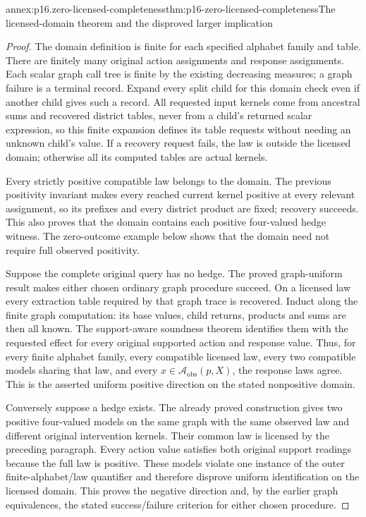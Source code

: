 \begin{annexitem}{annex:p16.zero-licensed-completeness}{thm:p16-zero-licensed-completeness}{The licensed-domain theorem and the disproved larger implication}
\begin{proof}
The domain definition is finite for each specified alphabet family
and table. There are finitely many original action assignments
and response assignments. Each scalar graph call tree is finite
by the existing decreasing measures; a graph failure is a terminal
record. Expand every split child for this domain check even if
another child gives such a record. All requested input kernels
come from ancestral sums and recovered district tables, never
from a child's returned scalar expression, so this finite expansion
defines its table requests without needing an unknown child's value.
If a recovery request fails, the law is outside the licensed
domain; otherwise all its computed tables are actual kernels.

Every strictly positive compatible law belongs to the domain.
The previous positivity invariant makes every reached current
kernel positive at every relevant assignment, so its prefixes
and every district product are fixed; recovery succeeds. This
also proves that the domain contains each positive four-valued
hedge witness. The zero-outcome example below shows that the
domain need not require full observed positivity.

Suppose the complete original query has no hedge. The proved
graph-uniform result makes either chosen ordinary graph procedure
succeed. On a licensed law every extraction table required by
that graph trace is recovered. Induct along the finite graph
computation: its base values, child returns, products and sums
are then all known. The support-aware soundness theorem identifies
them with the requested effect for every original supported
action and response value. Thus, for every finite alphabet
family, every compatible licensed law, every two compatible models
sharing that law, and every \(x\in\mathcal A_{\mathrm{obs}}(p,X)\),
the response laws agree. This is the asserted uniform positive
direction on the stated nonpositive domain.

Conversely suppose a hedge exists. The already proved construction
gives two positive four-valued models on the same graph with the
same observed law and different original intervention kernels.
Their common law is licensed by the preceding paragraph. Every
action value satisfies both original support readings because
the full law is positive. These models violate one instance of
the outer finite-alphabet/law quantifier and therefore disprove
uniform identification on the licensed domain. This proves the
negative direction and, by the earlier graph equivalences, the
stated success/failure criterion for either chosen procedure.


\end{proof}
\end{annexitem}
